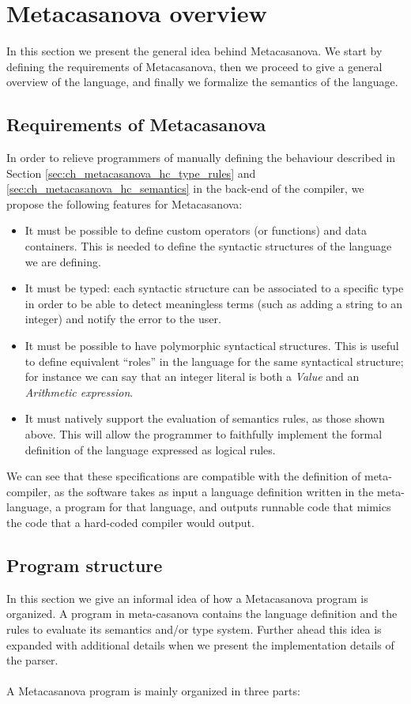 \section{Metacasanova overview}
\label{sec:ch_metacasanova_metacasanova_overview}
In this section we present the general idea behind Metacasanova. We start by defining the requirements of Metacasanova, then we proceed to give a general overview of the language, and finally we formalize the semantics of the language.

\subsection{Requirements of Metacasanova}
In order to relieve programmers of manually defining the behaviour described in Section \ref{sec:ch_metacasanova_hc_type_rules} and \ref{sec:ch_metacasanova_hc_semantics} in the back-end of the compiler, we propose the following features for Metacasanova:

\begin{itemize}
	\item It must be possible to define custom operators (or functions) and data containers. This is needed to define the syntactic structures of the language we are defining.
	\item It must be typed: each syntactic structure can be associated to a specific type in order to be able to detect meaningless terms (such as adding a string to an integer) and notify the error to the user.
	\item It must be possible to have polymorphic syntactical structures. This is useful to define equivalent ``roles'' in the language for the same syntactical structure; for instance we can say that an integer literal is both a \textit{Value} and an \textit{Arithmetic expression}.
	\item It must natively support the evaluation of semantics rules, as those shown above. This will allow the programmer to faithfully implement the formal definition of the language expressed as logical rules. 
\end{itemize}

We can see that these specifications are compatible with the definition of meta-compiler, as the software takes as input a language definition written in the meta-language, a program for that language, and outputs runnable code that mimics the code that a hard-coded compiler would output.

\subsection{Program structure}
\label{subsec:ch_metacasanova_program_structure}
In this section we give an informal idea of how a Metacasanova program is organized. A program in meta-casanova contains the language definition and the rules to evaluate its semantics and/or type system. Further ahead this idea is expanded with additional details when we present the implementation details of the parser.  \\\\
A Metacasanova program is mainly organized in three parts:

